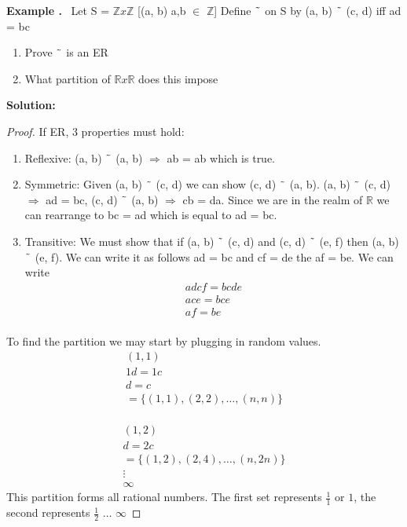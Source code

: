 \documentclass{article}
\newcounter{example}
\newcounter{solution}
\theoremstyle{definition}
\theoremstyle{claim}
\theoremstyle{remark}
\theoremstyle{theorem}
\newcommand\Example{%
  \stepcounter{example}%
  \textbf{Example \theexample.}~%
  \setcounter{solution}{0}%
}
\newcommand\TheSolution{%
  \textbf{Solution:}\\%
}
\begin{document}
\begin{flushleft}
\Example Let S = $\mathbb{Z}x\mathbb{Z}$ [(a, b) a,b $\in$ $\mathbb{Z}$]
Define $\char`\~$ on S by (a, b) $\char`\~$ (c, d) iff ad = bc
\begin{enumerate}
  \item Prove $\char`\~$ is an ER
  \item What partition of $\mathbb{R}x\mathbb{R}$ does this impose
\end{enumerate}
\TheSolution 
\begin{proof}
If ER, 3 properties must hold:
\begin{enumerate}
  \item Reflexive: (a, b) $\char`\~$ (a, b) $\Longrightarrow$ ab = ab which is true.
  \item Symmetric: Given (a, b) $\char`\~$ (c, d) we can show (c, d) $\char`\~$ (a, b). (a, b) $\char`\~$ (c, d) $\Longrightarrow$ ad = bc, (c, d) $\char`\~$ (a, b) $\Longrightarrow$ cb = da. Since we are in the realm of $\mathbb{R}$ we can rearrange to bc = ad which is equal to ad = bc.
  \item Transitive: We must show that if (a, b) $\char`\~$ (c, d) and (c, d) $\char`\~$ (e, f) then (a, b) $\char`\~$ (e, f). We can write it as follows ad = bc and cf = de  the af = be.
  We can write 
  \begin{gather*} 
  adcf = bcde   \\
  ace = bce     \\
  af = be       \\
  \end{gather*} 
\end{enumerate}
To find the partition we may start by plugging in random values.\\
\begin{gather*} 
(1, 1)  \\
1d = 1c \\
d = c   \\
= \{(1, 1), (2, 2), \dots, (n, n)\}
\end{gather*}\\
\begin{gather*} 
(1, 2)\\
d = 2c\\
= \{(1, 2), (2, 4), \dots, (n, 2n)\}\\
\vdots\\
\infty
\end{gather*} 
This partition forms all rational numbers. The first set represents $\frac{1}{1}$ or $1$, the second represents $\frac{1}{2}$ $\dots$ $\infty$
\end{proof}

\end{flushleft}
\end{document}
